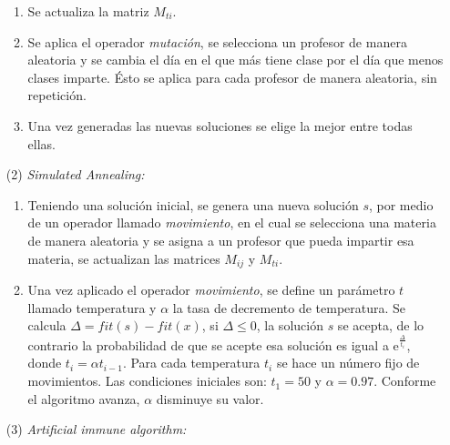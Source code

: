 \documentclass[12pt,spanish]{report}
\begin{document}
\begin{itemize}
\begin{enumerate}
\item Se actualiza la matriz $M_{ti}$.

\item Se aplica el operador \textit{mutación}, se selecciona un profesor de manera aleatoria y se cambia el día en el que más tiene clase por el día que menos clases imparte. Ésto se aplica para cada profesor de manera aleatoria, sin repetición.

\item Una vez generadas las nuevas soluciones se elige la mejor entre todas ellas.
\end{enumerate}

\item[(2)] \textit{Simulated Annealing: }



\begin{enumerate}
\item Teniendo una solución inicial, se genera una nueva solución $s$, por medio de un operador llamado \textit{movimiento}, en el cual se selecciona una materia de manera aleatoria y se asigna a un profesor que pueda impartir esa materia, se actualizan las matrices $M_{ij}$ y $M_{ti}$.

\item Una vez aplicado el operador \textit{movimiento}, se define un parámetro $t$ llamado temperatura y $\alpha$ la tasa de decremento de temperatura. Se calcula $\Delta = fit(s) - fit(x)$, si $\Delta \leqslant 0$, la solución $s$ se acepta, de lo contrario la probabilidad de que se acepte esa solución es igual a $\mathrm{e}^{\frac{\Delta}{t_{i}}}$, donde $t_{i} = \alpha t_{i-1}$. Para cada temperatura $t_{i}$ se hace un número fijo de movimientos. Las condiciones iniciales son: $t_{1} = 50$ y $\alpha = 0.97$. Conforme el algoritmo avanza, $\alpha$ disminuye su valor.
\end{enumerate}


\item[(3)] \textit{Artificial immune algorithm:} 


\end{itemize}
\end{document}
